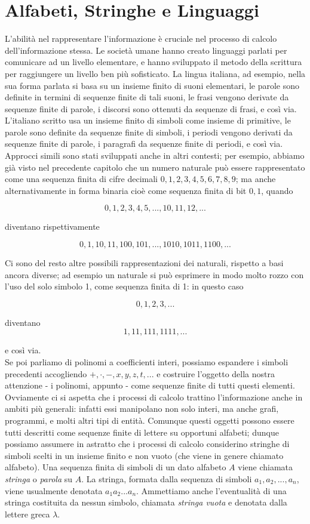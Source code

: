 \section{Alfabeti, Stringhe e Linguaggi}

L'abilità nel rappresentare l'informazione è cruciale nel processo di calcolo\\
dell'informazione stessa. Le società umane hanno creato linguaggi parlati
per comunicare ad un livello elementare, e hanno sviluppato il metodo della
scrittura per raggiungere un livello ben più sofisticato.
La lingua italiana, ad esempio, nella
sua forma parlata si basa su un insieme finito di suoni elementari,
le parole sono definite in termini di sequenze finite di tali suoni, le frasi vengono derivate da
sequenze finite di parole, i discorsi sono ottenuti da sequenze di frasi, e così via.
L'italiano scritto usa un insieme finito di simboli come insieme di primitive, le
parole sono definite da sequenze finite di simboli, i periodi vengono derivati da
sequenze finite di parole, i paragrafi da sequenze finite di periodi, e così via.
Approcci simili sono stati sviluppati anche in altri contesti; per esempio, abbiamo
già visto nel precedente capitolo che un numero naturale può essere rappresentato
come una sequenza finita di cifre decimali $0, 1, 2, 3, 4, 5, 6, 7, 8, 9$; ma anche
alternativamente in forma binaria cioè come sequenza finita di bit $0, 1$, quando

\[
    0, 1, 2, 3, 4, 5, ... , 10, 11, 12, ...
\]

diventano rispettivamente

\[
    0, 1, 10, 11, 100, 101, ... , 1010, 1011, 1100, ...
\]

Ci sono del resto altre possibili rappresentazioni dei naturali,
rispetto a basi ancora diverse;
ad esempio un naturale si può esprimere in modo molto rozzo con l'uso
del solo simbolo 1, come sequenza finita di 1: in questo caso

\[
    0, 1, 2, 3, ...
\]

diventano
\[
    1, 11, 111, 1111, ...
\]

e così via.\\
Se poi parliamo di polinomi a coefficienti interi, possiamo espandere i simboli
precedenti accogliendo $+, \cdot, -, x, y, z, t, ...$ e costruire l'oggetto della
nostra attenzione - i polinomi, appunto - come sequenze finite di tutti questi
elementi. Ovviamente ci si aspetta che i processi di calcolo trattino
l'informazione anche in ambiti più generali:
infatti essi manipolano non solo interi, ma anche grafi, programmi, e molti altri
tipi di entità. Comunque questi oggetti possono essere tutti
descritti come sequenze finite di lettere su opportuni alfabeti; dunque possiamo
assumere in astratto che i processi di calcolo considerino stringhe di simboli
scelti in un insieme finito e non vuoto (che viene in genere chiamato alfabeto).
Una sequenza finita di simboli di un dato alfabeto $A$ viene chiamata \textit{stringa} o
\textit{parola} su $A$. La stringa, formata dalla sequenza di simboli
$a_1, a_2, ..., a_n$, viene usualmente denotata $a_1a_2...a_n$.
Ammettiamo anche l'eventualità di una stringa
costituita da nessun simbolo, chiamata \textit{stringa vuota} e denotata
dalla lettere greca $\lambda$.

